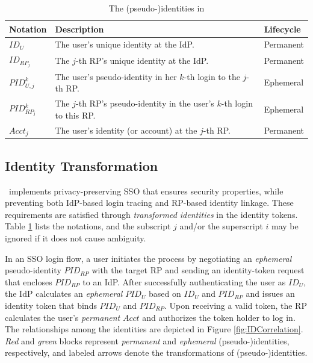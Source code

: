 \begin{table}[t]
\footnotesize
    \caption{The (pseudo-)identities in \usso}
    \centering
    \begin{tabular}{|p{0.93cm}|p{5.16cm}|p{1.13cm}|} \hline
    {\textbf{Notation}} & {\textbf{Description}} & {\textbf{Lifecycle}} \\ \hline
    {$ID_U$} & {The user's unique identity at the IdP.} & {Permanent} \\ \hline
    {$ID_{RP_j}$} & {The $j$-th RP's unique identity at the IdP.} & {Permanent} \\ \hline
    {$PID_{U,j}^k$} & {The user's pseudo-identity in her $k$-th login to the $j$-th RP.} & {Ephemeral} \\ \hline
    {$PID_{RP_j}^k$} & {The $j$-th RP's pseudo-identity in the user's $k$-th login to this RP.} & {Ephemeral} \\ \hline
    {$Acct_j$} & {The user's identity (or account) at the $j$-th RP.} & {Permanent} \\ \hline
    \end{tabular}
    \label{tbl:notations-dilemma}
\end{table}

\subsection{Identity Transformation}
\label{subsec:solutions}

\usso\ implements privacy-preserving SSO that ensures security properties, while preventing both IdP-based login tracing and RP-based identity linkage.
These requirements are satisfied through \emph{transformed identities} in the identity tokens. Table \ref{tbl:notations-dilemma} lists the notations,
and the subscript $j$ and/or the superscript $i$ may be ignored if it does not cause ambiguity.


In an SSO login flow, a user initiates the process by negotiating an \emph{ephemeral} pseudo-identity $PID_{RP}$  with the target RP and sending an identity-token request that encloses $PID_{RP}$ to an IdP.
After successfully authenticating the user as $ID_U$, the IdP calculates an \emph{ephemeral} $PID_U$ based on $ID_U$ and $PID_{RP}$ and issues an identity token that binds $PID_U$ and $PID_{RP}$. Upon receiving a valid token, the RP calculates the user's \emph{permanent} $Acct$ and authorizes the token holder to log in.
The relationships among the identities are depicted in Figure \ref{fig:IDCorrelation}.
\emph{Red} and \emph{green} blocks represent \emph{permanent} and \emph{ephemeral} (pseudo-)identities, respectively, and 
labeled arrows denote the transformations of (pseudo-)identities.


